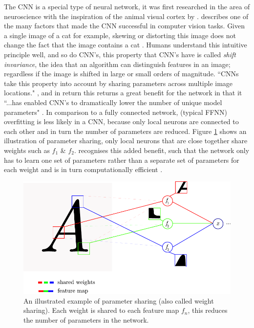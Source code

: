 \documentclass[report, 11pt, oneside]{dissertation}
\begin{document}
The CNN is a special type of neural network, it was first researched in the area of neuroscience with the inspiration of the animal visual cortex by \citep{hubel1962receptive}. \citep[247]{Goodfellow-et-al-2016} describes one of the many factors that made the CNN successful in computer vision tasks. Given a single image of a cat for example, skewing or distorting this image does not change the fact that the image contains a cat \citeyearpar[247]{Goodfellow-et-al-2016}. Humans understand this intuitive principle well, and so do CNN's, this property that CNN's have is called \textit{shift invariance}, the idea that an algorithm can distinguish features in an image; regardless if the image is shifted in large or small orders of magnitude. ``CNNs take this property into account by sharing parameters across multiple image locations." \citep[247]{Goodfellow-et-al-2016}, and in return this returns a great benefit for the network in that it ``...has enabled CNN's to dramatically lower the number of unique model parameters" \citep[247]{Goodfellow-et-al-2016}. In comparison to a fully connected network, (typical FFNN) overfitting is less likely in a CNN, because only local neurons are connected to each other and in turn the number of parameters are reduced. Figure \ref{fig:shared_weights} shows an illustration of parameter sharing, only local neurons that are close together share weights such as $ f_1 $ \& $ f_2 $. \citeauthor{Goodfellow-et-al-2016} recognises this added benefit, such that the network only has to learn one set of parameters rather than a separate set of parameters for each weight and is in turn computationally efficient \citeyearpar[328]{Goodfellow-et-al-2016}.

\begin{figure}[!htb]
	\centering
	\includegraphics[scale=0.65]{figure_8.pdf}
	\caption[An illustrated example of parameter sharing.]{An illustrated example of parameter sharing (also called weight sharing). Each weight is shared to each feature map $ f_n $, this reduces the number of parameters in the network.}
	\label{fig:shared_weights}
\end{figure}
\end{document}
